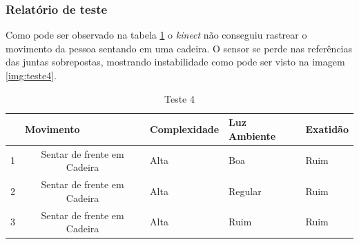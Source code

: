 \subsubsection{Relatório de teste}\label{sub:relteste4}
Como pode ser observado na tabela \ref{tab:teste4} o \textit{kinect} não conseguiu rastrear o movimento da pessoa sentando em uma cadeira. O sensor se perde nas referências das juntas
sobrepostas, mostrando instabilidade como pode ser visto na imagem \ref{img:teste4}.

\begin{table}[H]
\centering
\caption{Teste 4}
\label{tab:teste4}
\begin{tabular}{@{}|c|c|l|l|l|@{}}
\toprule
\multicolumn{1}{|l|}{ } & \multicolumn{1}{l|}{\textbf{Movimento}} & \textbf{Complexidade} & \textbf{Luz Ambiente} & \textbf{Exatidão} \\ \midrule
1                                 & Sentar de frente em Cadeira                     & Alta                 & Boa                   & Ruim               \\ \midrule
2                                 & Sentar de frente em Cadeira                     & Alta                 & Regular               & Ruim           \\ \midrule
3                                 & Sentar de frente em Cadeira                     & Alta                 & Ruim                  & Ruim              \\ \bottomrule
\end{tabular}
\end{table}


